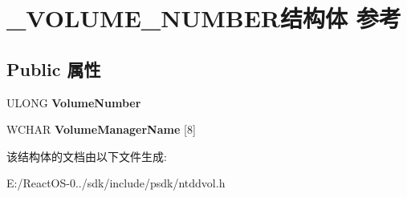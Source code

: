 \hypertarget{struct___v_o_l_u_m_e___n_u_m_b_e_r}{}\section{\+\_\+\+V\+O\+L\+U\+M\+E\+\_\+\+N\+U\+M\+B\+E\+R结构体 参考}
\label{struct___v_o_l_u_m_e___n_u_m_b_e_r}
\subsection*{Public 属性}
\begin{DoxyCompactItemize}
\item 
\mbox{\label{struct___v_o_l_u_m_e___n_u_m_b_e_r_ad7b7d8913900f41e70f1838840351f68}} 
U\+L\+O\+NG {\bfseries Volume\+Number}
\item 
\mbox{\label{struct___v_o_l_u_m_e___n_u_m_b_e_r_aa3fbe53db829191dc18c87c6a37d5c89}} 
W\+C\+H\+AR {\bfseries Volume\+Manager\+Name} \mbox{[}8\mbox{]}
\end{DoxyCompactItemize}


该结构体的文档由以下文件生成\+:\begin{DoxyCompactItemize}
\item 
E\+:/\+React\+O\+S-\/0../sdk/include/psdk/ntddvol.\+h\end{DoxyCompactItemize}
